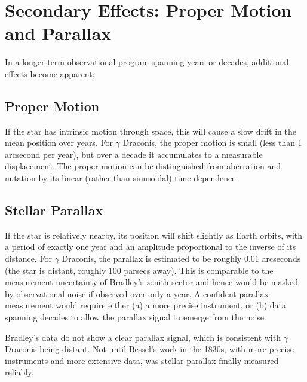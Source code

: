 \section{Secondary Effects: Proper Motion and Parallax}

In a longer-term observational program spanning years or decades, additional effects become apparent:

\subsection*{Proper Motion}

If the star has intrinsic motion through space, this will cause a slow drift in the mean position over years. For $\gamma$ Draconis, the proper motion is small (less than 1 arcsecond per year), but over a decade it accumulates to a measurable displacement. The proper motion can be distinguished from aberration and nutation by its linear (rather than sinusoidal) time dependence.

\subsection*{Stellar Parallax}

If the star is relatively nearby, its position will shift slightly as Earth orbits, with a period of exactly one year and an amplitude proportional to the inverse of its distance. For $\gamma$ Draconis, the parallax is estimated to be roughly 0.01 arcseconds (the star is distant, roughly 100 parsecs away). This is comparable to the measurement uncertainty of Bradley's zenith sector and hence would be masked by observational noise if observed over only a year. A confident parallax measurement would require either (a) a more precise instrument, or (b) data spanning decades to allow the parallax signal to emerge from the noise.

Bradley's data do not show a clear parallax signal, which is consistent with $\gamma$ Draconis being distant. Not until Bessel's work in the 1830s, with more precise instruments and more extensive data, was stellar parallax finally measured reliably.


